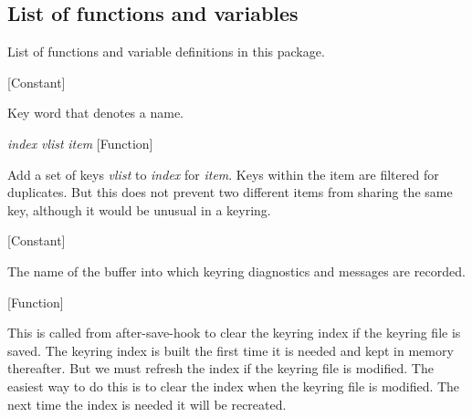\subsection{List of functions and variables}

List of functions and variable definitions in this package.



\vspace{1em}
\noindent
{}
\usebox{\funcname}
 \hfill [Constant]

\begin{doc-string}
Key word that denotes a name.
\end{doc-string}

\vspace{1em}
\noindent
{}
\usebox{\funcname}\emph{index} \emph{vlist} \emph{item}
 \hfill [Function]

\begin{doc-string}
Add a set of keys \emph{vlist} to \emph{index} for \emph{item}.  Keys within the item are filtered for
duplicates.  But this does not prevent two different items from sharing the same key,
although it would be unusual in a keyring.
\end{doc-string}

\vspace{1em}
\noindent
{}
\usebox{\funcname}
 \hfill [Constant]

\begin{doc-string}
The name of the buffer into which keyring diagnostics and messages
are recorded.
\end{doc-string}

\vspace{1em}
\noindent
{}
\usebox{\funcname}
 \hfill [Function]

\begin{doc-string}
This is called from after-save-hook to clear the keyring index if the keyring file is saved.
The keyring index is built the first time it is needed and kept in memory thereafter.  But we
must refresh the index if the keyring file is modified.  The easiest way to do this is to clear
the index when the keyring file is modified.  The next time the index is needed it will be
recreated.
\end{doc-string}

